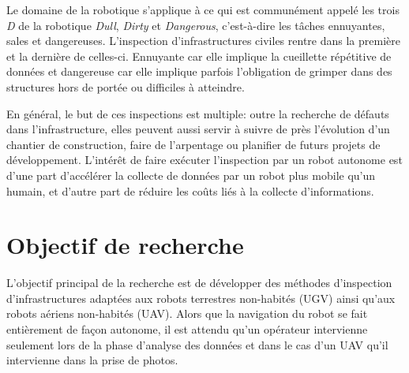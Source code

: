 \label{sec:Introduction}  %
Le domaine de la robotique s'applique à ce qui est communément appelé les trois \emph{D} de la robotique \emph{Dull}, \emph{Dirty} et \emph{Dangerous}, c'est-à-dire les tâches ennuyantes, sales et dangereuses. L'inspection d'infrastructures civiles rentre dans la première et la dernière de celles-ci. Ennuyante car elle implique la cueillette répétitive de données et dangereuse car elle implique parfois l'obligation de grimper dans des structures hors de portée ou difficiles à atteindre.

En général, le but de ces inspections est multiple: outre la recherche de défauts dans l'infrastructure, elles peuvent aussi servir à suivre de près l'évolution d'un chantier de construction, faire de l'arpentage ou planifier de futurs projets de développement. L'intérêt de faire exécuter l'inspection par un robot autonome est d'une part d'accélérer la collecte de données par un robot plus mobile qu'un humain, et d'autre part de réduire les coûts liés à la collecte d'informations.



\section{Objectif de recherche}

L'objectif principal de la recherche est de développer des méthodes d'inspection d'infrastructures adaptées aux robots terrestres non-habités (UGV) ainsi qu'aux robots aériens non-habités (UAV). Alors que la navigation du robot se fait entièrement de façon autonome, il est attendu qu'un opérateur intervienne seulement lors de la phase d'analyse des données et dans le cas d'un UAV qu'il intervienne dans la prise de photos.

